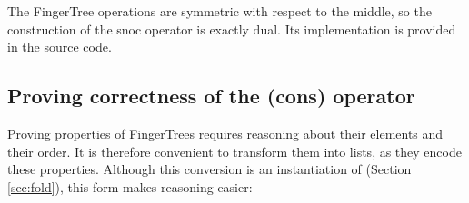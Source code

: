 \documentclass[12pt,twoside,notitlepage]{report}
\begin{document}
The FingerTree operations are symmetric with respect to the middle, so the construction of the snoc operator is exactly dual. Its implementation is provided in the source code.

\subsection{Proving correctness of the (cons) operator}

Proving properties of FingerTrees requires reasoning about their elements and their order. It is therefore convenient to transform them into lists, as they encode these properties.
Although this conversion is an instantiation of  (Section \ref{sec:fold}), this form makes reasoning easier:

\begin{code}
\\
\> \AgdaSymbol{:}  \AgdaSymbol{\{}\AgdaSymbol{\}\{} \AgdaSymbol{:}  \AgdaSymbol{\}\{} \AgdaSymbol{:}   \AgdaSymbol{\}}\<%
\\
\>[0]\<[10]%
\>[10]  \AgdaSymbol{:}   \<%
\\
\>[0]\<[10]%
\>[10]  \AgdaSymbol{:}     \AgdaSymbol{\{} \AgdaSymbol{:} \AgdaSymbol{\}}\<%
\\
\>[0]\<[10]%
\>[10]    \AgdaSymbol{\{}\AgdaSymbol{\}}\<%
\\
\>[0]\<[10]%
\>[10]  \<%
\\
\>  \AgdaSymbol{=} \AgdaInductiveConstructor{[]}\<%
\\
\> \AgdaSymbol{(} \AgdaSymbol{)} \AgdaSymbol{=}   \AgdaInductiveConstructor{[]}\<%
\\
\> \AgdaSymbol{(}   \AgdaSymbol{)} \AgdaSymbol{=} \AgdaSymbol{(} \AgdaSymbol{)} \AgdaFunction{++}\<%
\\
\>[10]\<[28]%
\>[28]\AgdaSymbol{(} \AgdaSymbol{(} \AgdaSymbol{))} \AgdaFunction{++}\<%
\\
\>[10]\<[28]%
\>[28]\AgdaSymbol{(} \AgdaSymbol{)}\<%
\\
\end{code}
\end{document}
